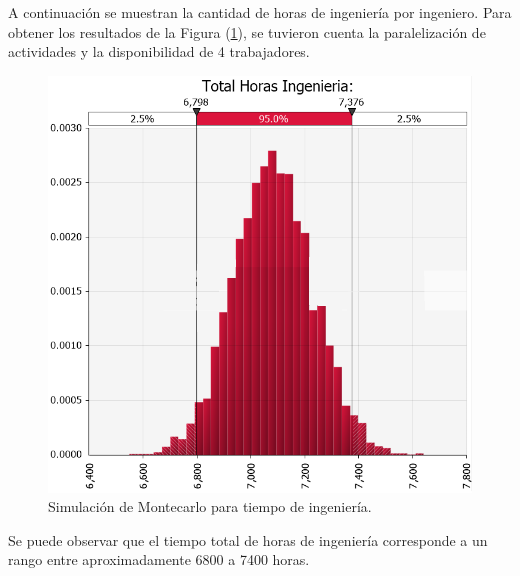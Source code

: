 A continuación se muestran la cantidad de horas de ingeniería por ingeniero. Para obtener los resultados de la Figura (\ref{fig:montecarlo_tiempos_ing}), se tuvieron cuenta la paralelización de actividades y la disponibilidad de 4 trabajadores.
\begin{figure}[H]
	\centering
	\includegraphics[width=0.5\linewidth]{ImagenesFactibilidad/montecarlo_tiempo_largo}	
	\caption{Simulación de Montecarlo para tiempo de ingeniería.}
	\label{fig:montecarlo_tiempos_ing}
\end{figure}

Se puede observar que el tiempo total de horas de ingeniería corresponde a un rango entre aproximadamente 6800 a 7400 horas.